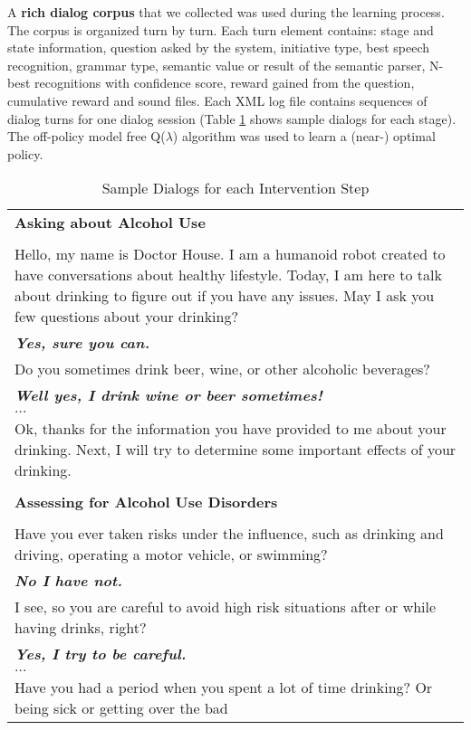 \documentclass[letterpaper]{article}
\begin{document}
\begin{sloppy}
A {\bf rich dialog corpus} that we collected was used during the learning process. The corpus is 
organized turn by 
turn. Each turn element contains: stage and state information, question asked by the system,  
initiative type,  best speech recognition, grammar type, semantic value or result of the semantic 
parser, N-best recognitions with confidence score, reward gained from the question, cumulative 
reward and sound files. Each XML log file contains sequences of dialog turns for one dialog 
session (Table \ref{sampleDialog} shows  sample dialogs for each stage). The off-policy model free 
Q($\lambda$) algorithm was used to learn a (near-) optimal policy.

\begin{table}[!h]
\caption{Sample Dialogs for each Intervention Step}
\label{sampleDialog}
{\small
\begin{tabular}{ p{80mm}  } \hline
    \textbf{Asking about Alcohol Use} \\
    \\
    Hello, my name is Doctor House. I am a humanoid robot created to have conversations about 
healthy lifestyle. Today, I am here to talk about drinking to figure out if you have any issues.  
May I ask you few questions about your drinking? \\
\bf{\em{Yes, sure you can.}}\\
Do you sometimes drink beer, wine, or other alcoholic beverages?\\
\bf{\em{Well yes, I drink wine or beer sometimes!}} \\
$\ldots$\\
Ok, thanks for the information you have provided to me about your drinking. Next, I will try to 
determine some important effects of your drinking. \\
\\
    \hline
    \textbf{Assessing for Alcohol Use Disorders} \\
    \\
    Have you ever taken risks under the influence, such as drinking and driving, operating a motor 
vehicle, or swimming?\\
\bf{\em{No I have not.}} \\
I see, so you are careful to avoid high risk situations after or while having drinks, right?\\
\bf{\em{Yes, I try to be careful.}} \\
$\ldots$\\
Have you had a period when you spent a lot of time drinking? Or being sick or getting over the bad 

\end{tabular}}
\end{table}
\end{sloppy}
\end{document}
